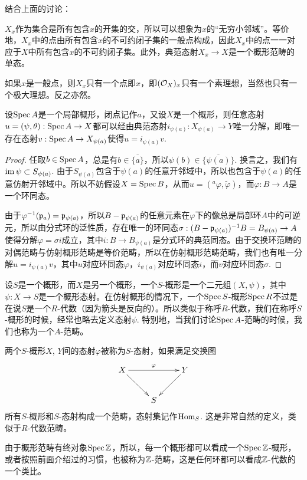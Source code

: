 结合上面的讨论：

\begin{pro}
$X_x$作为集合是所有包含$x$的开集的交，所以可以想象为$x$的“无穷小邻域”。等价地，$X_x$中的点由所有包含$x$的不可约闭子集的一般点构成，因此$X_x$中的点一一对应于$X$中所有包含$x$的不可约闭子集。此外，典范态射$X_x\to X$是一个概形范畴的单态。
\end{pro}

如果$x$是一般点，则$X_x$只有一个点即$x$，即$(\mathcal{O}_X)_x$只有一个素理想，当然也只有一个极大理想。反之亦然。

\begin{pro}\label{pro:4.6}
设$\operatorname{Spec} A$是一个局部概形，闭点记作$a$，又设$X$是一个概形，则任意态射$u=(\psi,\theta):\operatorname{Spec} A\to X$都可以经由典范态射$i_{\psi(a)}:X_{\psi(a)}\to Y$唯一分解，即唯一存在态射$v:\operatorname{Spec} A\to X_{\psi(a)}$使得$u=i_{\psi(a)}v$. 
\end{pro}

\begin{proof}
任取$b\in \operatorname{Spec} A$，总是有$b\in\overline{\{a\}}$，所以$\psi(b)\in \overline{\{\psi(a)\}}$. 换言之，我们有$\operatorname{im} \psi\subset S_{\psi(a)}$. 由于$S_{\psi(a)}$包含于$\psi(a)$的任意开邻域中，所以也包含于$\psi(a)$的任意仿射开邻域中。所以不妨假设$X=\operatorname{Spec} B$，从而$u=({}^a\varphi,\widetilde{\varphi})$，而$\varphi:B\to A$是一个环同态。

由于$\varphi^{-1}(\mathfrak{p}_a)=\mathfrak{p}_{\psi(a)}$，所以$B-\mathfrak{p}_{\psi(a)}$的任意元素在$\varphi$下的像总是局部环$A$中的可逆元，所以由分式环的泛性质，存在唯一的环同态$\sigma:(B-\mathfrak{p}_{\psi(a)})^{-1}B=B_{\psi(a)}\to A$使得分解$\varphi=\sigma i$成立，其中$i:B\to B_{\psi(a)}$是分式环的典范同态。由于交换环范畴的对偶范畴与仿射概形范畴是等价范畴，所以在仿射概形范畴范畴，我们也有唯一分解$u=i_{\psi(a)}v$，其中$u$对应环同态$\varphi$，$i_{\psi(a)}$对应环同态$i$，而$v$对应环同态$\sigma$.
\end{proof}

\begin{para}[$S$-概形]
设$S$是一个概形，而$X$是另一个概形，一个$S$-概形是一个二元组$(X,\psi)$，其中$\psi:X\to S$是一个概形态射。在仿射概形的情况下，一个$\operatorname{Spec} S$-概形$\operatorname{Spec} R$不过是在说$S$是一个$R$-代数（因为箭头是反向的）。所以类似于称呼$R$-代数，我们在称呼$S$-概形的时候，经常也略去定义态射$\psi$. 特别地，当我们讨论$\operatorname{Spec} A$-范畴的时候，我们也称为一个$A$-范畴。

两个$S$-概形$X$, $Y$间的态射$\varphi$被称为$S$-态射，如果满足交换图
\[
	\xymatrix{
	X\ar[rr]^\varphi \ar[rd]&&Y\ar[ld]\\
	&S&
	}
\]
所有$S$-概形和$S$-态射构成一个范畴，态射集记作$\operatorname{Hom}_S$. 这是非常自然的定义，类似于$R$-代数范畴。

由于概形范畴有终对象$\operatorname{Spec} \mathbb{Z}$，所以，每一个概形都可以看成一个$\operatorname{Spec} \mathbb{Z}$-概形，或者按照前面介绍过的习惯，也被称为$\mathbb{Z}$-范畴，这是任何环都可以看成$\mathbb{Z}$-代数的一个类比。
\end{para}

